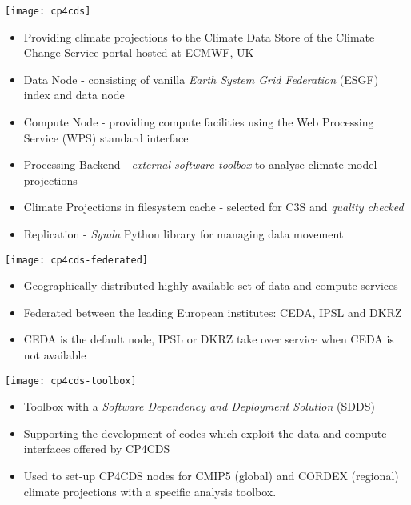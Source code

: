 \documentclass[portrait,a0paper,fontscale=0.4]{baposter} %
\newcommand{\compresslist}{%
\setlength{\itemsep}{1pt}%
\setlength{\parskip}{0pt}%
\setlength{\parsep}{0pt}%
}
\begin{document}
\begin{poster}
{   \begin{minipage}{0.25\textwidth}
     \texttt{[image: cp4cds]}
   \end{minipage}
   \begin{minipage}{0.75\textwidth}
     \begin{itemize}\compresslist
       \item Providing climate projections to the Climate Data Store of the
        Climate Change Service portal hosted at ECMWF, UK
       \item Data Node - consisting of vanilla \emph{Earth System Grid Federation} (ESGF) index and data node
       \item Compute Node - providing compute facilities using the Web Processing Service (WPS) standard interface
       \item Processing Backend - \emph{external software toolbox} to analyse climate model projections
       \item Climate Projections in filesystem cache - selected for C3S and \emph{quality checked}
       \item Replication - \emph{Synda} Python library for managing data movement
     \end{itemize}
     \vspace{1em}
  \end{minipage}
  \begin{minipage}{0.25\textwidth}
    \texttt{[image: cp4cds-federated]}
  \end{minipage}
  \begin{minipage}{0.75\textwidth}
    \begin{itemize}\compresslist
      \item Geographically distributed highly available set of data and compute services
      \item Federated between the leading European institutes: CEDA, IPSL and DKRZ
      \item CEDA is the default node, IPSL or DKRZ take over service when CEDA is not available
    \end{itemize}
    \vspace{1em}
  \end{minipage}
  \begin{minipage}{0.25\textwidth}
    \texttt{[image: cp4cds-toolbox]}
  \end{minipage}
  \begin{minipage}{0.75\textwidth}
    \begin{itemize}\compresslist
      \item Toolbox with a \emph{Software Dependency and Deployment Solution} (SDDS)
      \item Supporting the development of codes which exploit the data and compute interfaces offered by CP4CDS
      \item Used to set-up CP4CDS nodes for CMIP5 (global) and CORDEX (regional) climate projections with
        a specific analysis toolbox.
    \end{itemize}
    \vspace{1em}
  \end{minipage}
 }


\end{poster}
\end{document}
